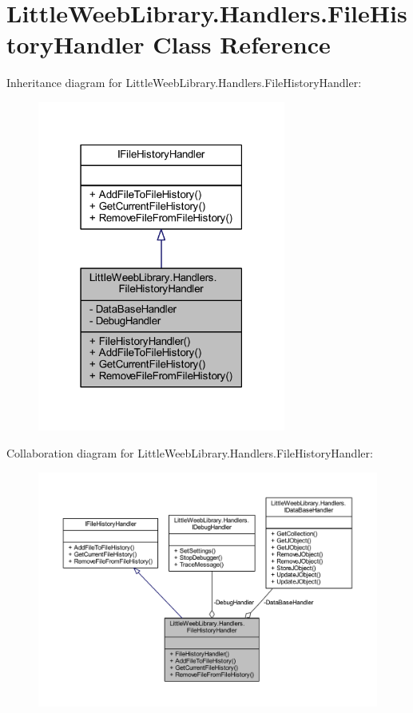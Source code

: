 \hypertarget{class_little_weeb_library_1_1_handlers_1_1_file_history_handler}{}\section{Little\+Weeb\+Library.\+Handlers.\+File\+History\+Handler Class Reference}
\label{class_little_weeb_library_1_1_handlers_1_1_file_history_handler}


Inheritance diagram for Little\+Weeb\+Library.\+Handlers.\+File\+History\+Handler\+:\nopagebreak
\begin{figure}[H]
\begin{center}
\leavevmode
\includegraphics[width=231pt]{class_little_weeb_library_1_1_handlers_1_1_file_history_handler__inherit__graph}
\end{center}
\end{figure}


Collaboration diagram for Little\+Weeb\+Library.\+Handlers.\+File\+History\+Handler\+:\nopagebreak
\begin{figure}[H]
\begin{center}
\leavevmode
\includegraphics[width=350pt]{class_little_weeb_library_1_1_handlers_1_1_file_history_handler__coll__graph}
\end{center}
\end{figure}
